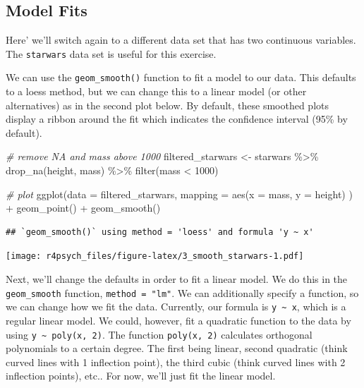 \documentclass[
]{book}
\newenvironment{Shaded}{\begin{snugshade}}{\end{snugshade}}
\newcommand{\AttributeTok}[1]{\textcolor[rgb]{0.77,0.63,0.00}{#1}}
\newcommand{\CommentTok}[1]{\textcolor[rgb]{0.56,0.35,0.01}{\textit{#1}}}
\newcommand{\DecValTok}[1]{\textcolor[rgb]{0.00,0.00,0.81}{#1}}
\newcommand{\FunctionTok}[1]{\textcolor[rgb]{0.00,0.00,0.00}{#1}}
\newcommand{\NormalTok}[1]{#1}
\newcommand{\OtherTok}[1]{\textcolor[rgb]{0.56,0.35,0.01}{#1}}
\newcommand{\SpecialCharTok}[1]{\textcolor[rgb]{0.00,0.00,0.00}{#1}}
\begin{document}
\hypertarget{model-fits}{%
\subsection{Model Fits}\label{model-fits}}

Here' we'll switch again to a different data set that has two continuous variables. The \texttt{starwars} data set is useful for this exercise.

We can use the \texttt{geom\_smooth()} function to fit a model to our data. This defaults to a loess method, but we can change this to a linear model (or other alternatives) as in the second plot below. By default, these smoothed plots display a ribbon around the fit which indicates the confidence interval (95\% by default).

\begin{Shaded}
\begin{Highlighting}[]
\CommentTok{\# remove NA and mass above 1000}
\NormalTok{filtered\_starwars }\OtherTok{\textless{}{-}}\NormalTok{ starwars }\SpecialCharTok{\%\textgreater{}\%} 
  \FunctionTok{drop\_na}\NormalTok{(height, mass) }\SpecialCharTok{\%\textgreater{}\%} 
  \FunctionTok{filter}\NormalTok{(mass }\SpecialCharTok{\textless{}} \DecValTok{1000}\NormalTok{)}

\CommentTok{\# plot}
\FunctionTok{ggplot}\NormalTok{(}\AttributeTok{data =}\NormalTok{ filtered\_starwars, }
       \AttributeTok{mapping =} \FunctionTok{aes}\NormalTok{(}\AttributeTok{x =}\NormalTok{ mass, }\AttributeTok{y =}\NormalTok{ height)}
\NormalTok{       ) }\SpecialCharTok{+} 
  \FunctionTok{geom\_point}\NormalTok{() }\SpecialCharTok{+} 
  \FunctionTok{geom\_smooth}\NormalTok{()}
\end{Highlighting}
\end{Shaded}

\begin{verbatim}
## `geom_smooth()` using method = 'loess' and formula 'y ~ x'
\end{verbatim}

\texttt{[image: r4psych\_files/figure-latex/3\_smooth\_starwars-1.pdf]}

Next, we'll change the defaults in order to fit a linear model. We do this in the \texttt{geom\_smooth} function, \texttt{method\ =\ "lm"}. We can additionally specify a function, so we can change how we fit the data. Currently, our formula is \texttt{y\ \textasciitilde{}\ x}, which is a regular linear model. We could, however, fit a quadratic function to the data by using \texttt{y\ \textasciitilde{}\ poly(x,\ 2)}. The function \texttt{poly(x,\ 2)} calculates orthogonal polynomials to a certain degree. The first being linear, second quadratic (think curved lines with 1 inflection point), the third cubic (think curved lines with 2 inflection points), etc.. For now, we'll just fit the linear model.
\end{document}
